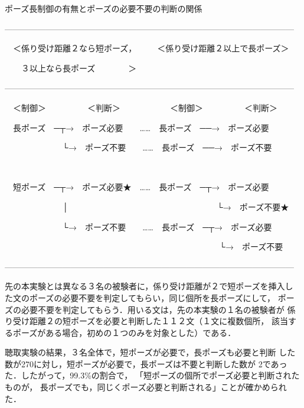 \begin{table*}
\caption{ポーズ長制御の有無とポーズの必要不要の判断の関係}
\label{ポーズ長制御の有無とポーズの必要不要の判断の関係}


———————————————————————————————————
\vspace{-2mm}

　＜係り受け距離２なら短ポーズ，　　　＜係り受け距離２以上で長ポーズ＞
\vspace{-2mm}

　　３以上なら長ポーズ　　　　＞
\vspace{-2mm}

———————————————————————————————————
\vspace{-2mm}

　＜制御＞　　　　　＜判断＞　　　　　　＜制御＞　　　　　＜判断＞ 
\vspace{-2mm}

　長ポーズ　─┬→　ポーズ必要　　……　長ポーズ　──→　ポーズ必要
\vspace{-2mm}

　　　　　　　└→　ポーズ不要　　……　長ポーズ　──→　ポーズ不要
\vspace{-2mm}

　　　　　　　　　　　　　　
\vspace{-2mm}

　短ポーズ　─┬→　ポーズ必要★　……　長ポーズ　─┬→　ポーズ必要
\vspace{-2mm}

　　　　　　　│　　　　　　　　　　　　　　　　　　└→　ポーズ不要★
\vspace{-2mm}

　　　　　　　└→　ポーズ不要　　……　長ポーズ　─┬→　ポーズ必要
\vspace{-2mm}

　　　　　　　　　　　　　　　　　　　　　　　　　　└→　ポーズ不要
\vspace{-2mm}

———————————————————————————————————

\end{table*}

先の本実験とは異なる３名の被験者に，係り受け距離が２で短ポーズを挿入し
た文のポーズの必要不要を判定してもらい，同じ個所を長ポーズにして，
ポーズの必要不要を判定してもらう．用いる文は，先の本実験の１名の被験者が
係り受け距離２の短ポーズを必要と判断した１１２文（１文に複数個所，
該当するポーズがある場合，初めの１つのみを対象とした）である．

聴取実験の結果，３名全体で，短ポーズが必要で，長ポーズも必要と判断
した数が270に対し，短ポーズが必要で，長ポーズは不要と判断した数が
2であった．したがって，99.3\%の割合で，
「短ポーズの個所でポーズ必要と判断されたものが，
  長ポーズでも，同じくポーズ必要と判断される」ことが確かめられた．


